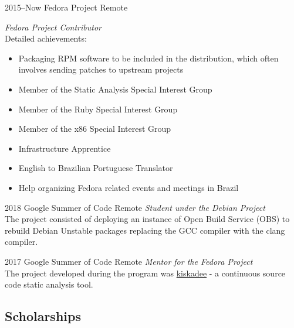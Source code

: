 \documentclass[print]{friggeri-cv}
\begin{document}
\begin{entrylist}

\entry
{2015--Now}
{Fedora Project}
{Remote}
{\emph{Fedora Project Contributor} \\
Detailed achievements:
  \begin{itemize}
    \item Packaging RPM software to be included in the distribution, which often involves sending patches to upstream projects
    \item Member of the Static Analysis Special Interest Group
    \item Member of the Ruby Special Interest Group
    \item Member of the x86 Special Interest Group
    \item Infrastructure Apprentice
    \item English to Brazilian Portuguese Translator
    \item Help organizing Fedora related events and meetings in Brazil
  \end{itemize}}


\entry
{2018}
{Google Summer of Code}
{Remote}
{\emph{Student under the Debian Project} \\
  The project consisted of deploying an instance of Open Build Service (OBS) to
  rebuild Debian Unstable packages replacing the GCC compiler with the clang
  compiler. \\
 }


\entry
{2017}
{Google Summer of Code}
{Remote}
{\emph{Mentor for the Fedora Project} \\
  The project developed during the program was
  \href{pagure.io/kiskadee}{kiskadee} - a continuous source code static
  analysis tool. \\
 }


\end{entrylist}

\subsection{Scholarships}
\end{document}
